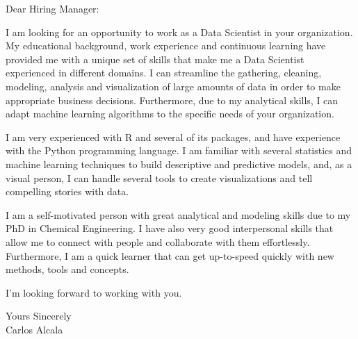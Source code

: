 \documentclass[a4paper,english]{friggeri-letter}
\begin{document}

\address{
   Milwaukee, Wisconsin
}



\opening{Dear Hiring Manager:}

I am looking for an opportunity to work as a Data Scientist in your organization. My educational background, work experience and continuous learning have provided me with a unique set of skills that make me a Data Scientist experienced in different domains. I can streamline the gathering, cleaning, modeling, analysis and visualization of large amounts of data in order to make appropriate business decisions. Furthermore, due to my analytical skills, I can adapt machine learning algorithms to the specific needs of your organization.

I am very experienced with R and several of its packages, and have experience with the Python programming language. I am familiar with several statistics and machine learning techniques to build descriptive and predictive models, and, as a visual person, I can handle several tools to create visualizations and tell compelling stories with data.

I am a self-motivated person with great analytical and modeling skills due to my PhD in Chemical Engineering. I have also very good interpersonal skills that allow me to connect with people and collaborate with them effortlessly. Furthermore, I am a quick learner that can get up-to-speed quickly with new methods, tools and concepts.

I'm looking forward to working with you.

\closing{
  \flushright Yours Sincerely\\
   Carlos Alcala}
\end{document}
